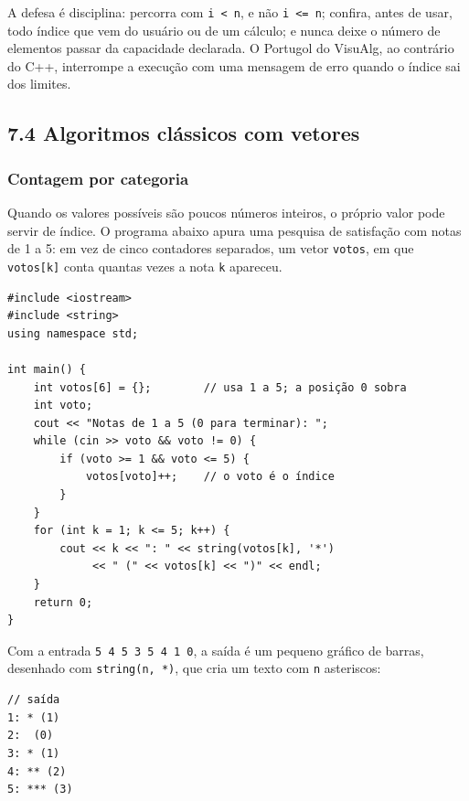 A defesa é disciplina: percorra com \texttt{i < n}, e não \texttt{i <= n}; confira, antes de usar, todo índice que vem do usuário ou de um cálculo; e nunca deixe o número de elementos passar da capacidade declarada. O Portugol do VisuAlg, ao contrário do C++, interrompe a execução com uma mensagem de erro quando o índice sai dos limites.

\subsection{7.4 Algoritmos clássicos com vetores}

\subsubsection{Contagem por categoria}

Quando os valores possíveis são poucos números inteiros, o próprio valor pode servir de índice. O programa abaixo apura uma pesquisa de satisfação com notas de 1 a 5: em vez de cinco contadores separados, um vetor \texttt{votos}, em que \texttt{votos[k]} conta quantas vezes a nota \texttt{k} apareceu.

\begin{codigo}
\begin{Verbatim}[breaklines=true, breaksymbolleft={}, fontsize=\footnotesize]
#include <iostream>
#include <string>
using namespace std;

int main() {
    int votos[6] = {};        // usa 1 a 5; a posição 0 sobra
    int voto;
    cout << "Notas de 1 a 5 (0 para terminar): ";
    while (cin >> voto && voto != 0) {
        if (voto >= 1 && voto <= 5) {
            votos[voto]++;    // o voto é o índice
        }
    }
    for (int k = 1; k <= 5; k++) {
        cout << k << ": " << string(votos[k], '*')
             << " (" << votos[k] << ")" << endl;
    }
    return 0;
}
\end{Verbatim}
\end{codigo}

Com a entrada \texttt{5 4 5 3 5 4 1 0}, a saída é um pequeno gráfico de barras, desenhado com \texttt{string(n, \textquotesingle{}*\textquotesingle{})}, que cria um texto com \texttt{n} asteriscos:

\begin{codigo}
\begin{Verbatim}[breaklines=true, breaksymbolleft={}, fontsize=\footnotesize]
// saída
1: * (1)
2:  (0)
3: * (1)
4: ** (2)
5: *** (3)
\end{Verbatim}
\end{codigo}

